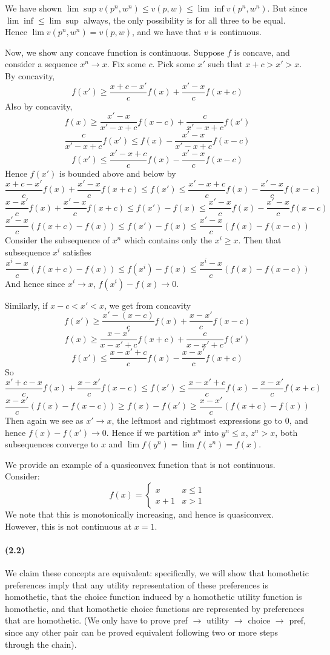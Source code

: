 \documentclass[10pt,letter]{article}
\begin{document}
We have shown $\lim \sup v(p^n, w^n) \le v(p,w) \le \lim \inf v(p^n, w^n)$. But since $\lim \inf \le \lim \sup$ always, the only possibility is for all three to be equal. Hence $\lim v(p^n, w^n) = v(p,w)$, and we have that $v$ is continuous.

Now, we show any concave function is continuous. Suppose $f$ is concave, and consider a sequence $x^n \to x$. Fix some $c$. Pick some $x'$ such that $x+c > x' > x$. By concavity,
\[ f(x') \ge \frac{x + c -x'}{c}f(x) + \frac{x'-x}{c}f(x + c)  \]
Also by concavity,
\[ f(x) \ge \frac{x'-x}{x'-x+c}f(x-c) + \frac{c}{x'-x+c}f(x') \]
\[ \frac{c}{x'-x+c}f(x') \le f(x) - \frac{x'-x}{x'-x+c}f(x-c) \]
\[ f(x') \le \frac{x'-x+c}{c}f(x) - \frac{x'-x}{c}f(x-c) \]
Hence $f(x')$ is bounded above and below by
\[ \frac{x + c -x'}{c}f(x) + \frac{x'-x}{c}f(x + c) \le f(x') \le \frac{x'-x+c}{c}f(x) - \frac{x'-x}{c}f(x-c)\]
\[ \frac{x -x'}{c}f(x) + \frac{x'-x}{c}f(x + c) \le f(x') - f(x) \le \frac{x'-x}{c}f(x) - \frac{x'-x}{c}f(x-c)\]
\[ \frac{x'-x}{c}(f(x+c) - f(x)) \le f(x') - f(x) \le \frac{x'-x}{c}(f(x) - f(x-c)) \]
Consider the subsequence of $x^n$ which contains only the $x^i \ge x$. Then that subsequence $x^i$ satisfies
\[ \frac{x^i-x}{c}(f(x+c) - f(x)) \le f(x^i) - f(x) \le \frac{x^i-x}{c}(f(x) - f(x-c)) \]
And hence since $x^i \to x$, $f(x^i) - f(x) \to 0$.

Similarly, if $x-c < x' < x$, we get from concavity
\[ f(x') \ge \frac{x' - (x- c)}{c}f(x) + \frac{x-x'}{c}f(x - c)  \]
\[ f(x) \ge \frac{x-x'}{x-x'+c}f(x+c) + \frac{c}{x-x'+c}f(x') \]
\[ f(x') \le \frac{x-x'+c}{c}f(x) - \frac{x-x'}{c}f(x+c) \]
So
\[ \frac{x' + c - x}{c}f(x) + \frac{x-x'}{c}f(x - c) \le f(x') \le \frac{x-x'+c}{c}f(x) - \frac{x-x'}{c}f(x+c) \]
\[ \frac{x-x'}{c}(f(x) - f(x - c) ) \ge f(x) - f(x') \ge \frac{x-x'}{c}(f(x+c) - f(x)) \]
Then again we see as $x' \to x$, the leftmost and rightmost expressions go to $0$, and hence $f(x) -f(x') \to 0$. Hence if we partition $x^n$ into $y^n \le x$, $z^n > x$, both subsequences converge to $x$ and $\lim f(y^n) = \lim f(z^n) = f(x)$.

We provide an example of a quasiconvex function that is not continuous. Consider:
\[ f(x) =
  \begin{cases}
    x &  x \le 1 \\
    x+1 & x > 1
  \end{cases}
  \]
We note that this is monotonically increasing, and hence is quasiconvex. However, this is not continuous at $x=1$.
\paragraph{(2.2)}
We claim these concepts are equivalent: specifically, we will show that homothetic preferences imply that any utility representation of these preferences is homothetic, that the choice function induced by a homothetic utility function is homothetic, and that homothetic choice functions are represented by preferences that are homothetic. (We only have to prove pref $\to$ utility $\to$ choice $\to$ pref, since any other pair can be proved equivalent following two or more steps through the chain).
\end{document}

